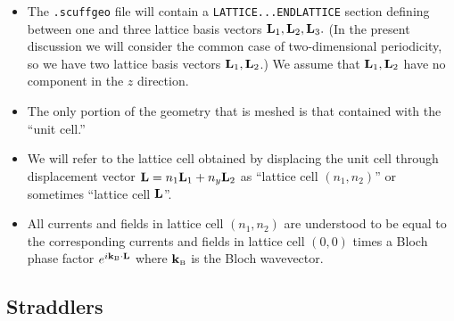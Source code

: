 \begin{itemize}
 \item The \texttt{.scuffgeo} file will contain
       a \texttt{LATTICE...ENDLATTICE} section defining 
       between one and three lattice basis vectors 
       $\mathbf{L}_1, \mathbf{L}_2, \mathbf{L}_3.$ (In the present 
       discussion we will consider the common case
       of two-dimensional periodicity, so we have two
       lattice basis vectors $\mathbf{L}_1, \mathbf{L}_2$.) 
       We assume that $\mathbf{L}_1, \mathbf{L}_2$ have no 
       component in the $z$ direction.
 \item The only portion of the geometry that is
       meshed is that contained with the ``unit cell.''
 \item We will refer to the lattice cell obtained by 
       displacing the unit cell through displacement 
       vector $\mathbf{L}=n_1 \mathbf{L}_1 + n_y \mathbf{L}_2$ as 
       ``lattice cell $(n_1, n_2)$'' or sometimes
       ``lattice cell $\mathbf{L}$''.
 \item All currents and fields in lattice cell $(n_1,n_2)$
       are understood to be equal to the corresponding
       currents and fields in lattice cell $(0,0)$ times
       a Bloch phase factor $e^{i\mathbf{k}_{\hbox{\tiny{B}}} \cdot \mathbf{L}}$ where
       $\mathbf{k}_{\hbox{\tiny{B}}}$ is the Bloch wavevector.
\end{itemize}

\subsection{Straddlers}

